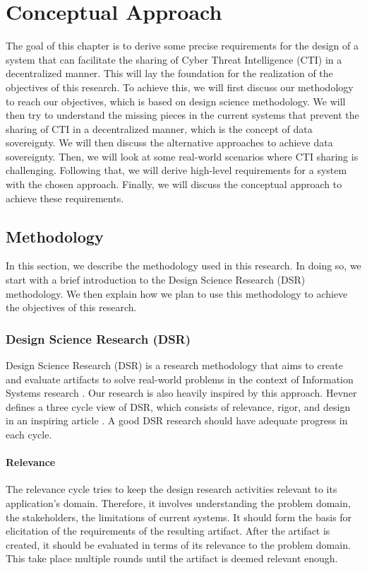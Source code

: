 \chapter{Conceptual Approach}
\label{chap:conceptual-approach}
The goal of this chapter is to derive some precise requirements for the design of a system that can facilitate the sharing of Cyber Threat Intelligence (CTI) in a decentralized manner. This will lay the foundation for the realization of the objectives of this research. To achieve this, we will first discuss our methodology to reach our objectives, which is based on design science methodology. We will then try to understand the missing pieces in the current systems that prevent the sharing of CTI in a decentralized manner, which is the concept of data sovereignty. We will then discuss the alternative approaches to achieve data sovereignty. Then, we will look at some real-world scenarios where CTI sharing is challenging. Following that, we will derive high-level requirements for a system with the chosen approach. Finally, we will discuss the conceptual approach to achieve these requirements.

\section{Methodology}
In this section, we describe the methodology used in this research. In doing so, we start with a brief introduction to the Design Science Research (DSR) methodology. We then explain how we plan to use this methodology to achieve the objectives of this research.

\subsection{Design Science Research (DSR)}
Design Science Research (DSR) is a research methodology that aims to create and evaluate artifacts to solve real-world problems in the context of Information Systems research \cite{hevner_three_2007}. Our research is also heavily inspired by this approach. Hevner defines a three cycle view of DSR, which consists of relevance, rigor, and design in an inspiring article \cite{hevner_three_2007}. A good DSR research should have adequate progress in each cycle. 
\subsubsection{Relevance}
The relevance cycle tries to keep the design research activities relevant to its application's domain. Therefore, it involves understanding the problem domain, the stakeholders, the limitations of current systems. It should form the basis for elicitation of the requirements of the resulting artifact. After the artifact is created, it should be evaluated in terms of its relevance to the problem domain. This take place multiple rounds until the artifact is deemed relevant enough.

